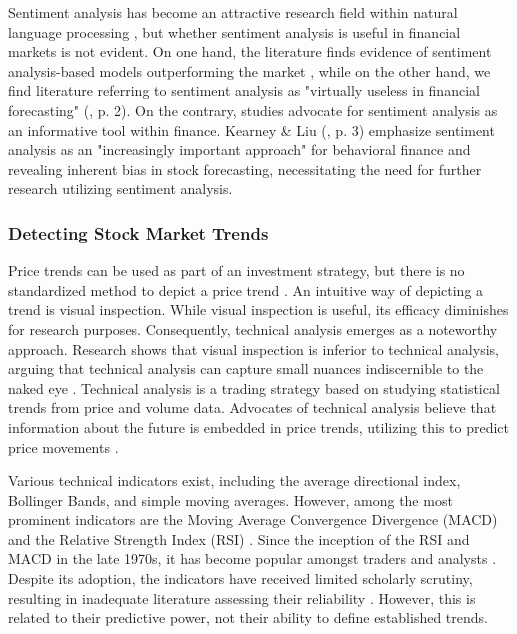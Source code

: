 Sentiment analysis has become an attractive research field within natural language processing \parencite{cui2023survey}, but whether sentiment analysis is useful in financial markets is not evident. On one hand, the literature finds evidence of sentiment analysis-based models outperforming the market \parencite{nguyen2015sentiment, }, while on the other hand, we find literature referring to sentiment analysis as "virtually useless in financial forecasting" (\cite{lai2023sentiment}, p. 2). %
On the contrary, studies advocate for sentiment analysis as an informative tool within finance. Kearney \& Liu (\cite*{kearney2014textual}, p. 3) emphasize sentiment analysis as an "increasingly important approach" for behavioral finance and revealing inherent bias in stock forecasting, necessitating the need for further research utilizing sentiment analysis.  


\subsubsection{Detecting Stock Market Trends}


Price trends can be used as part of an investment strategy, but there is no standardized method to depict a price trend \parencite{investopediaIdentifyingMarket}. An intuitive way of depicting a trend is visual inspection. While visual inspection is useful, its efficacy diminishes for research purposes. Consequently, technical analysis emerges as a noteworthy approach. Research shows that visual inspection is inferior to technical analysis, arguing that technical analysis can capture small nuances indiscernible to the naked eye \parencite{hojem1988empirical}. Technical analysis is a trading strategy based on studying statistical trends from price and volume data. Advocates of technical analysis believe that information about the future is embedded in price trends, utilizing this to predict price movements \parencite{investopediaTechnicalAnalysis}. 

Various technical indicators exist, including the average directional index, Bollinger Bands, and simple moving averages. However, among the most prominent indicators are the Moving Average Convergence Divergence (MACD) and the Relative Strength Index (RSI) \parencite{chong2008technical, frade2019technical}. Since the inception of the RSI and MACD in the late 1970s, it has become popular amongst traders and analysts \parencite{chong2014revisiting}. Despite its adoption, the indicators have received limited scholarly scrutiny, resulting in inadequate literature assessing their reliability \parencite{ulku2013drivers}. However, this is related to their predictive power, not their ability to define established trends.


